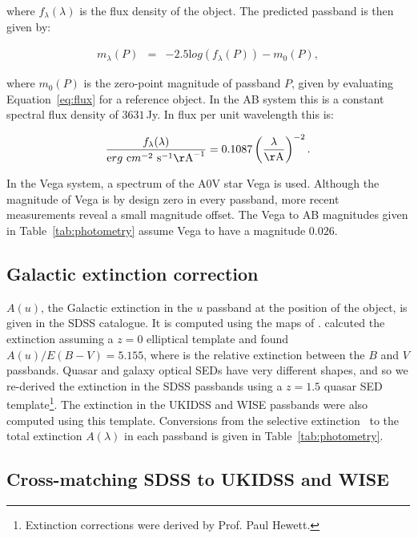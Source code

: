 \noindent where $f_\lambda(\lambda)$ is the flux density of the object. 
The predicted passband is then given by:   

\begingroup\makeatletter{}\check@mathfonts
\begin{eqnarray}
\label{eq:mag}
  m_\lambda(P) & = & -2.5{\mathrm log}(f_\lambda(P)) - m_0(P), 
\end{eqnarray}
\endgroup

\noindent where $m_0(P)$ is the zero-point magnitude of passband $P$, given by evaluating Equation~\ref{eq:flux} for a reference object. 
In the AB system this is a constant spectral flux density of $3631$\,Jy. 
In flux per unit wavelength this is:  

\begingroup\makeatletter{}\check@mathfonts
\begin{eqnarray}
  \frac{f_\lambda(\lambda)}{{\mathrm erg}~{\mathrm cm}^{-2}~{\mathrm s}^{-1} {\mathrm\AA}^{-1}} = 0.1087 \left(\frac{\lambda}{\mathrm \AA}\right)^{-2}.
\end{eqnarray}
\endgroup

\noindent In the Vega system, a spectrum of the A$0$V star Vega is used. 
Although the magnitude of Vega is by design zero in every passband, more recent measurements reveal a small magnitude offset.
The Vega to AB magnitudes given in Table~\ref{tab:photometry} assume Vega to have a magnitude $0.026$. 

\subsection{Galactic extinction correction}

$A(u)$, the Galactic extinction in the $u$ passband at the position of the object, is given in the SDSS catalogue. 
It is computed using the maps of \citet{schlegel98}.
\citet{schlegel98} calcuted the extinction assuming a $z=0$ elliptical template and found $A(u)/E(B-V)=5.155$, where \ebv is the relative extinction between the $B$ and $V$ passbands. 
Quasar and galaxy optical SEDs have very different shapes, and so we re-derived the extinction in the SDSS passbands using a $z=1.5$ quasar SED template\footnote{Extinction corrections were derived by Prof. Paul Hewett.}.
The extinction in the UKIDSS and WISE passbands were also computed using this template. 
Conversions from the selective extinction \ebv\, to the total extinction $A(\lambda)$ in each passband is given in Table~\ref{tab:photometry}.  
 
\subsection{Cross-matching SDSS to UKIDSS and WISE}

